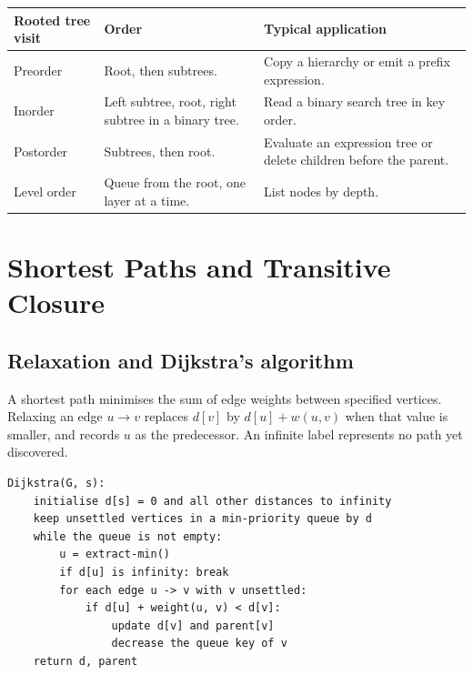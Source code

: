 \documentclass[12pt,a4paper]{article}
\begin{document}
\par\vspace{5pt}
\begingroup
\setlength{\extrarowheight}{1pt}
\noindent\begin{tabularx}{\linewidth}{|B{3.4cm}|Y|Y|}
\hline
\textbf{Rooted tree visit} & \textbf{Order} & \textbf{Typical application} \\ \hline
Preorder & Root, then subtrees. & Copy a hierarchy or emit a prefix expression. \\ \hline
Inorder & Left subtree, root, right subtree in a binary tree. & Read a binary search tree in key order. \\ \hline
Postorder & Subtrees, then root. & Evaluate an expression tree or delete children before the parent. \\ \hline
Level order & Queue from the root, one layer at a time. & List nodes by depth. \\ \hline
\end{tabularx}\par
\endgroup

\section{Shortest Paths and Transitive Closure}
\subsection{Relaxation and Dijkstra's algorithm}
\begin{tcolorbox}[defbox, title={Shortest path and relaxation}]
A shortest path minimises the sum of edge weights between specified vertices. Relaxing an edge $u\to v$ replaces $d[v]$ by $d[u]+w(u,v)$ when that value is smaller, and records $u$ as the predecessor. An infinite label represents no path yet discovered.
\end{tcolorbox}

\begin{tcolorbox}[formulabox, title={Dijkstra with a min-priority queue}]
\begin{verbatim}
Dijkstra(G, s):
    initialise d[s] = 0 and all other distances to infinity
    keep unsettled vertices in a min-priority queue by d
    while the queue is not empty:
        u = extract-min()
        if d[u] is infinity: break
        for each edge u -> v with v unsettled:
            if d[u] + weight(u, v) < d[v]:
                update d[v] and parent[v]
                decrease the queue key of v
    return d, parent
\end{verbatim}
\end{tcolorbox}
\end{document}
